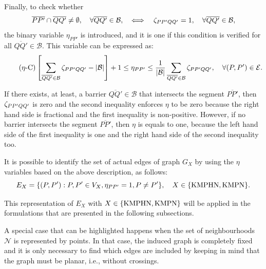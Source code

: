 \documentclass[a4paper,  review, authoryear, 1p.]{elsarticle}
\newcommand{\B}{{\mathcal B}}
\newcommand{\EB}{{E^{}_{\mathcal B}}}
\newcommand{\CV}[1]{{\color{blue}#1}}
\newcommand{\segment}[2]{\overline{#1#2}}
\begin{document}
	\newcommand{\etavar}[2]{\eta_{#1#2}}
	
	Finally, to check whether
	\CV{
	$$\overline{PP'}\cap \overline{QQ'}\neq\emptyset,\quad \forall \overline{QQ'}\in\B,\quad\Longleftrightarrow\quad \zetacheck{P}{P'}{Q}{Q'}=1,\quad\forall \overline{QQ'}\in\B,$$}
	the binary variable $\etavar{P}{P'}$ is introduced, and it is one if this condition is verified for all $\overline{QQ'}\in\B$. This variable can be expressed as: 
	\CV{
	\begin{equation*}\tag{$\eta$-C}\label{eq:etaC}
		\left[\sum_{\overline{QQ'}\in\mathcal B}\zetacheck{P}{P'}{Q}{Q'}-|\mathcal B|\right] + 1\leq \etavar{P}{P'}\leq \frac{1}{|\B|}\sum_{\overline{QQ'}\in\mathcal B}\zetacheck{P}{P'}{Q}{Q'},\quad\forall (P,P')\in\mathcal E.
	\end{equation*}}
	
	If there exists, at least, a barrier $\overline{QQ'}\in\B$ that intersects the segment $\overline{PP'}$, then $\zeta_{PP'QQ'}$ is zero and the second inequality enforces $\eta$ to be zero because the right hand side is fractional and the first inequality is non-positive. However, if no barrier intersects the segment $\segment{P}{P'}$, then $\eta$ is equals to one, because the left hand side of the first inequality is one and the right hand side of the second inequality too.
	
	It is possible to identify the set of actual edges of graph $G_X$ by using the $\eta$ variables based on the above description, as follows:
	$$ E_X = \{(P, P'):P,P'\in V_X,\etavar{P}{P'}=1, P\neq P'\}, \quad X\in \{\rm KMPHN, \rm KMPN\}.$$
	
	This representation of $E_X$ with $X\in \{\rm KMPHN, \rm KMPN\}$ will be applied in the formulations that are presented in the following subsections. 
	
	A special case that can be highlighted happens when the set of neighbourhoods \CV{$\mathcal N$} is represented by points. In that case, the induced graph is completely fixed and it is only necessary to find which edges are included by keeping in mind that the graph must be planar, i.e., without crossings.
	
\end{document}
